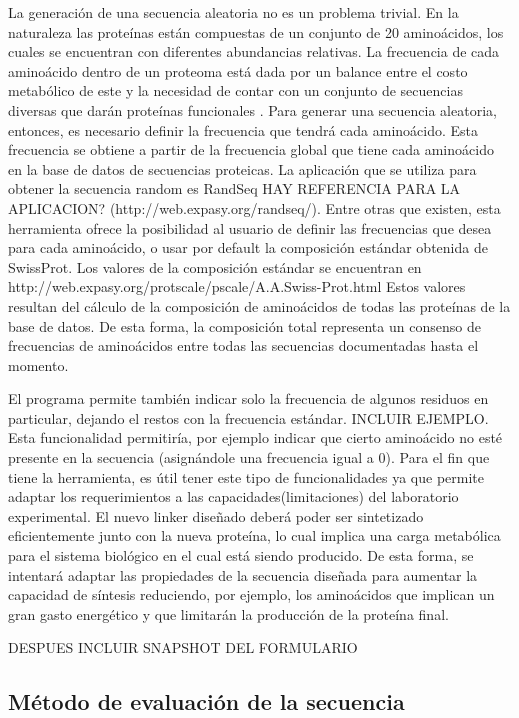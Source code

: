 La generación de una secuencia aleatoria no es un problema trivial. 
En la naturaleza las proteínas están compuestas de un conjunto de 20 aminoácidos, los cuales se encuentran con diferentes abundancias relativas. 
La frecuencia de cada aminoácido dentro de un proteoma está dada por un balance entre el costo metabólico de este y la necesidad de contar con un conjunto de secuencias diversas que darán proteínas funcionales \cite{krick2014amino}. 
Para generar una secuencia aleatoria, entonces, es necesario definir la frecuencia que tendrá cada aminoácido. Esta frecuencia se obtiene a partir de la frecuencia global que tiene cada aminoácido en la base de datos de secuencias proteicas.
La aplicación que se utiliza para obtener la secuencia random es RandSeq 
HAY REFERENCIA PARA LA APLICACION?
(http://web.expasy.org/randseq/). Entre otras que existen, esta herramienta ofrece la posibilidad al usuario de definir las frecuencias que desea para cada aminoácido, o usar por default la composición estándar obtenida de SwissProt.  
Los valores de la composición estándar se encuentran en http://web.expasy.org/protscale/pscale/A.A.Swiss-Prot.html
Estos valores resultan del cálculo de la composición de aminoácidos de todas las proteínas de la base de datos. De esta forma, la composición total representa un consenso de frecuencias de aminoácidos entre todas las secuencias documentadas hasta el momento.

El programa permite también indicar solo la frecuencia de algunos residuos en particular, dejando el restos con la frecuencia estándar. INCLUIR EJEMPLO.
Esta funcionalidad permitiría, por ejemplo indicar que cierto aminoácido no esté presente en la secuencia (asignándole una frecuencia igual a 0). Para el fin que tiene la herramienta, es útil tener este tipo de funcionalidades ya que permite adaptar los requerimientos a las capacidades(limitaciones) del laboratorio experimental. El nuevo linker diseñado deberá poder ser sintetizado eficientemente junto con la nueva proteína, lo cual implica una carga metabólica para el sistema biológico en el cual está siendo producido. De esta forma, se intentará adaptar las propiedades de la secuencia diseñada para aumentar la capacidad de síntesis reduciendo, por ejemplo, los aminoácidos que implican un gran gasto energético y que limitarán la producción de la proteína final.


DESPUES INCLUIR SNAPSHOT DEL FORMULARIO



\subsection{Método de evaluación de la secuencia}


